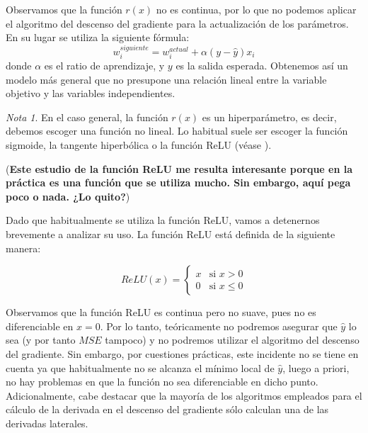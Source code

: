 \documentclass[12pt, a4paper, twoside]{book}
\numberwithin{equation}{section}
\theoremstyle{definition}
\theoremstyle{remark}
\newtheorem*{remark}{Nota}
\theoremstyle{plain}
\begin{document}
	Observamos que la función $r(x)$ no es continua, por lo que no 
	podemos aplicar el algoritmo del descenso del gradiente para la 
	actualización de los parámetros. En su lugar se utiliza la siguiente 
	fórmula:
	\begin{equation*}
		w_{i}^{siguiente}=w_{i}^{actual}+\alpha(y-\hat{y})x_{i}
	\end{equation*}
	donde $\alpha$ es el ratio de aprendizaje, y $y$ es la salida 
	esperada. Obtenemos así un modelo más general que no presupone una 
	relación lineal entre la variable objetivo y las variables 
	independientes. 
	
	\begin{remark}	
	En el caso general, la función $r(x)$ es un hiperparámetro, es decir,
	debemos escoger una función no lineal. Lo habitual suele ser escoger
	la función sigmoide, la tangente hiperbólica o la función ReLU (véase 
	\cite{Goodfellow-et-al-2016}).
	\end{remark}
	
	(\textbf{Este estudio de la función ReLU me resulta interesante porque 
	en la práctica es una función que se utiliza mucho. Sin embargo, aquí 
	pega poco o nada. ¿Lo quito?})

	Dado que habitualmente se utiliza la función ReLU, vamos a detenernos 
	brevemente a analizar su uso. La función ReLU está definida de la 
	siguiente manera:

	\begin{equation}
		\label{def:ReLU}
		ReLU(x)=\left \{
			\begin{array}{ll}
				x&\text{si }x>0\\
				0&\text{si }x\leq0
			\end{array} 
		     \right .
	\end{equation}
	
	Observamos que la función ReLU es continua pero no suave, pues no es 
	diferenciable en $x=0$. Por lo tanto, teóricamente no podremos 
	asegurar que $\hat{y}$ lo sea (y por tanto $MSE$ tampoco) y no 
	podremos utilizar el algoritmo del 
	descenso del gradiente. Sin embargo, por 
	cuestiones prácticas, este incidente no se tiene en cuenta ya que 
	habitualmente no se alcanza el mínimo local de $\hat{y}$, luego a 
	priori, no hay problemas en que la función no sea diferenciable en 
	dicho punto. Adicionalmente, cabe 
	destacar que la mayoría de los algoritmos empleados para el cálculo de 
	la derivada en el descenso del gradiente sólo calculan una de las 
	derivadas laterales.
\end{document}
